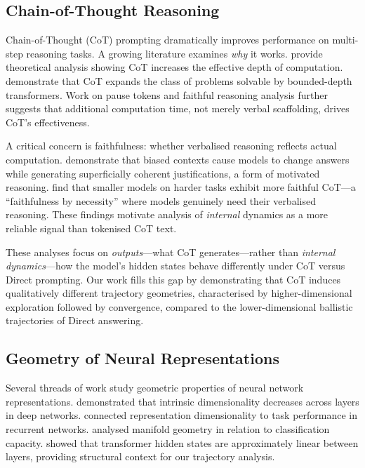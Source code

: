 \documentclass[11pt,twocolumn]{article}
\begin{document}
\subsection{Chain-of-Thought Reasoning}

Chain-of-Thought (CoT) prompting \citep{wei2022chain} dramatically improves performance on multi-step reasoning tasks. A growing literature examines \emph{why} it works. \citet{feng2024towards} provide theoretical analysis showing CoT increases the effective depth of computation. \citet{merrill2024expressive} demonstrate that CoT expands the class of problems solvable by bounded-depth transformers. Work on pause tokens \citep{goyal2024think} and faithful reasoning analysis \citep{lanham2023measuring} further suggests that additional computation time, not merely verbal scaffolding, drives CoT's effectiveness.

A critical concern is faithfulness: whether verbalised reasoning reflects actual computation. \citet{turpin2024language} demonstrate that biased contexts cause models to change answers while generating superficially coherent justifications, a form of motivated reasoning. \citet{korbak2025faithfulness} find that smaller models on harder tasks exhibit more faithful CoT---a ``faithfulness by necessity'' where models genuinely need their verbalised reasoning. These findings motivate analysis of \emph{internal} dynamics as a more reliable signal than tokenised CoT text.

These analyses focus on \emph{outputs}---what CoT generates---rather than \emph{internal dynamics}---how the model's hidden states behave differently under CoT versus Direct prompting. Our work fills this gap by demonstrating that CoT induces qualitatively different trajectory geometries, characterised by higher-dimensional exploration followed by convergence, compared to the lower-dimensional ballistic trajectories of Direct answering.

\subsection{Geometry of Neural Representations}

Several threads of work study geometric properties of neural network representations. \citet{ansuini2019intrinsic} demonstrated that intrinsic dimensionality decreases across layers in deep networks. \citet{recanatesi2019dimensionality} connected representation dimensionality to task performance in recurrent networks. \citet{cohen2020separability} analysed manifold geometry in relation to classification capacity. \citet{razzhigaev2024your} showed that transformer hidden states are approximately linear between layers, providing structural context for our trajectory analysis.
\end{document}
